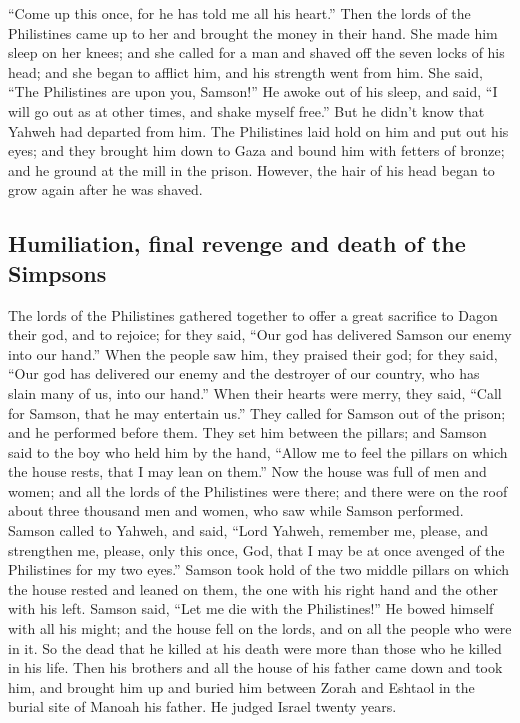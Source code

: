 ``Come up this once, for he has told me all his heart.'' Then the lords
of the Philistines came up to her and brought the money in their hand.
 She made him sleep on her knees; and she called for a
man and shaved off the seven locks of his head; and she began to afflict
him, and his strength went from him.  She said, ``The
Philistines are upon you, Samson!'' He awoke out of his sleep, and said,
``I will go out as at other times, and shake myself free.'' But he
didn't know that Yahweh had departed from him.  The
Philistines laid hold on him and put out his eyes; and they brought him
down to Gaza and bound him with fetters of bronze; and he ground at the
mill in the prison.  However, the hair of his head began
to grow again after he was shaved.

\hypertarget{humiliation-final-revenge-and-death-of-the-simpsons}{%
\subsection{Humiliation, final revenge and death of the
Simpsons}\label{humiliation-final-revenge-and-death-of-the-simpsons}}

 The lords of the Philistines gathered together to offer
a great sacrifice to Dagon their god, and to rejoice; for they said,
``Our god has delivered Samson our enemy into our hand.''
 When the people saw him, they praised their god; for
they said, ``Our god has delivered our enemy and the destroyer of our
country, who has slain many of us, into our hand.''  When
their hearts were merry, they said, ``Call for Samson, that he may
entertain us.'' They called for Samson out of the prison; and he
performed before them. They set him between the pillars; 
and Samson said to the boy who held him by the hand, ``Allow me to feel
the pillars on which the house rests, that I may lean on them.''
 Now the house was full of men and women; and all the
lords of the Philistines were there; and there were on the roof about
three thousand men and women, who saw while Samson performed.
 Samson called to Yahweh, and said, ``Lord Yahweh,
remember me, please, and strengthen me, please, only this once, God,
that I may be at once avenged of the Philistines for my two eyes.''
 Samson took hold of the two middle pillars on which the
house rested and leaned on them, the one with his right hand and the
other with his left.  Samson said, ``Let me die with the
Philistines!'' He bowed himself with all his might; and the house fell
on the lords, and on all the people who were in it. So the dead that he
killed at his death were more than those who he killed in his life.
 Then his brothers and all the house of his father came
down and took him, and brought him up and buried him between Zorah and
Eshtaol in the burial site of Manoah his father. He judged Israel twenty
years.

